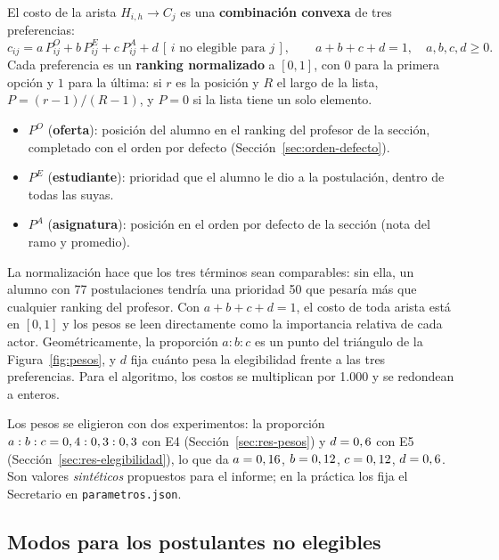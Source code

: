 \documentclass{article}
\begin{document}
El costo de la arista $H_{i,h} \to C_j$ es una \textbf{combinación convexa} de tres preferencias:
\[
    c_{ij} = a\,P^O_{ij} + b\,P^E_{ij} + c\,P^A_{ij} + d\,[\,i \text{ no elegible para } j\,], \qquad a + b + c + d = 1,\quad a, b, c, d \geq 0.
\]
Cada preferencia es un \textbf{ranking normalizado} a $[0, 1]$, con $0$ para la primera opción y $1$ para la última: si $r$ es la posición y $R$ el largo de la lista, $P = (r - 1)/(R - 1)$, y $P = 0$ si la lista tiene un solo elemento.
\begin{itemize}
    \item $P^O$ (\textbf{oferta}): posición del alumno en el ranking del profesor de la sección, completado con el orden por defecto (Sección~\ref{sec:orden-defecto}).
    \item $P^E$ (\textbf{estudiante}): prioridad que el alumno le dio a la postulación, dentro de todas las suyas.
    \item $P^A$ (\textbf{asignatura}): posición en el orden por defecto de la sección (nota del ramo y promedio).
\end{itemize}
La normalización hace que los tres términos sean comparables: sin ella, un alumno con 77 postulaciones tendría una prioridad 50 que pesaría más que cualquier ranking del profesor. Con $a + b + c + d = 1$, el costo de toda arista está en $[0, 1]$ y los pesos se leen directamente como la importancia relativa de cada actor. Geométricamente, la proporción $a : b : c$ es un punto del triángulo de la Figura~\ref{fig:pesos}, y $d$ fija cuánto pesa la elegibilidad frente a las tres preferencias. Para el algoritmo, los costos se multiplican por 1.000 y se redondean a enteros.

Los pesos se eligieron con dos experimentos: la proporción $a : b : c = 0,4 : 0,3 : 0,3$ con E4 (Sección~\ref{sec:res-pesos}) y $d = 0,6$ con E5 (Sección~\ref{sec:res-elegibilidad}), lo que da $a = 0,16$, $b = 0,12$, $c = 0,12$, $d = 0,6$. Son valores \emph{sintéticos} propuestos para el informe; en la práctica los fija el Secretario en \texttt{parametros.json}.

\subsection{Modos para los postulantes no elegibles}
\label{sec:modos}
\end{document}
